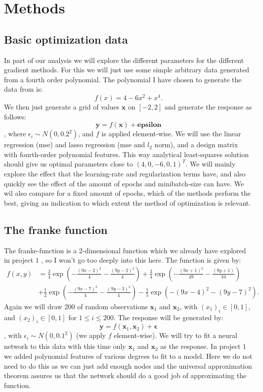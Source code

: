 \documentclass{article}
\begin{document}
\section{Methods}
\subsection{Basic optimization data}
\label{basicoptdesc}
In part of our analysis we will explore the different parameters for the
different gradient methods. For this we will just use some simple arbitrary data
generated from a fourth order polynomial. The polynomial I have chosen to
generate the data from is:
$$f(x) = 4 - 6 x^2 + x^4.$$
We then just generate a grid of values $\bm{x}$ on $[-2, 2]$ and generate the
response as follows:
$$\bm{y} = f(\bm{x}) + \bm{epsilon}$$
, where $\epsilon_i \sim N(0, 0.2^2)$, and $f$ is applied element-wise.  We will
use the linear regression (mse) and lasso regression (mse and $l_2$ norm), and a
design matrix with fourth-order polynomial features. This way analytical
least-squares solution should give us optimal parameters close to $(4, 0, -6, 0,
      1)^T$. We will mainly explore the effect that the learning-rate and
regularization terms have, and also quickly see the effect of the amount
of epochs and minibatch-size can have. We wil also compare for a fixed
amount of epochs, which of the methods perform the best, giving an
indication to which extent the method of optimization is relevant.

\subsection{The franke function}
The franke-function is a $2$-dimensional function which we already have explored
in project $1$ \cite{githubrepoproject1}, so I won't go too deeply into this
here. The function is given by:
\begin{align*}
      f(x,y) & = \frac{3}{4}\exp{\left(-\frac{(9x-2)^2}{4} - \frac{(9y-2)^2}{4}\right)}+\frac{3}{4}\exp{\left(-\frac{(9x+1)^2}{49}- \frac{(9y+1)}{10}\right)} \\
             & +\frac{1}{2}\exp{\left(-\frac{(9x-7)^2}{4} - \frac{(9y-3)^2}{4}\right)} -\frac{1}{5}\exp{\left(-(9x-4)^2 - (9y-7)^2\right) }.
\end{align*}
Again we will draw 200 of random observations $\bm{x}_1$ and $\bm{x}_2$, with
$(x_1)_i \in [0, 1]$, and $(x_2)_i \in [0, 1]$ for $1 \leq i \leq 200$. The response will be generated by:
$$\bm{y} = f(\bm{x}_1, \bm{x}_2) + \bm{\epsilon}$$
, with $\epsilon_i \sim N(0, 0.1^2)$ (we apply $f$ element-wise). We will try to
fit a neural network to this data with this time only $\bm{x}_1$ and $\bm{x}_2$
as the response. In project $1$ we added polynomial features of various degrees
to fit to a model. Here we do not need to do this as we can just add enough
nodes and the universal approximation theorem assures us that the network should
do a good job of approximating the function.
\end{document}
